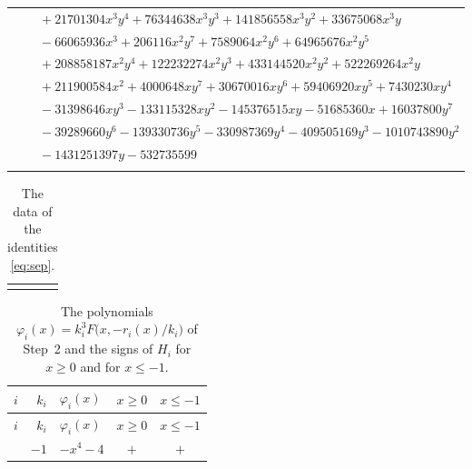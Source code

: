 \documentclass[11pt]{article}
\begin{document}
\begin{longtable}{@{}ll@{}}
 & $\quad +21701304x^{3}y^{4}+76344638x^{3}y^{3}+141856558x^{3}y^{2}+33675068x^{3}y$\\
 & $\quad -66065936x^{3}+206116x^{2}y^{7}+7589064x^{2}y^{6}+64965676x^{2}y^{5}$\\
 & $\quad +208858187x^{2}y^{4}+122232274x^{2}y^{3}+433144520x^{2}y^{2}+522269264x^{2}y$\\
 & $\quad +211900584x^{2}+4000648xy^{7}+30670016xy^{6}+59406920xy^{5}+7430230xy^{4}$\\
 & $\quad -31398646xy^{3}-133115328xy^{2}-145376515xy-51685360x+16037800y^{7}$\\
 & $\quad -39289660y^{6}-139330736y^{5}-330987369y^{4}-409505169y^{3}-1010743890y^{2}$\\
 & $\quad -1431251397y-532735599$\\
\addlinespace[3pt]
\end{longtable}
\endgroup

\begingroup\footnotesize
\setlength{\LTcapwidth}{\textwidth}
\begin{longtable}{@{}ll@{}}
\caption{The data of the identities \eqref{eq:sep}.}\label{tab:sep}\\
\hline\endfirsthead\hline\endhead\hline\endfoot
\end{longtable}
\endgroup

\begingroup\footnotesize
\setlength{\LTcapwidth}{\textwidth}
\begin{longtable}{@{}rrlcc@{}}
\caption{The polynomials $\varphi_i(x)=k_i^3F\bigl(x,-r_i(x)/k_i\bigr)$ of Step~2 and the signs of $H_i$ for $x\geq0$ and for $x\leq-1$.}\label{tab:phi}\\
\hline $i$ & $k_i$ & $\varphi_i(x)$ & $x\geq0$ & $x\leq-1$\\\hline\endfirsthead\hline $i$ & $k_i$ & $\varphi_i(x)$ & $x\geq0$ & $x\leq-1$\\\hline\endhead\hline\endfoot
0 & $-1$ & $-x^{4}-4$ & $+$ & $+$\\
\end{longtable}
\endgroup
\end{document}
